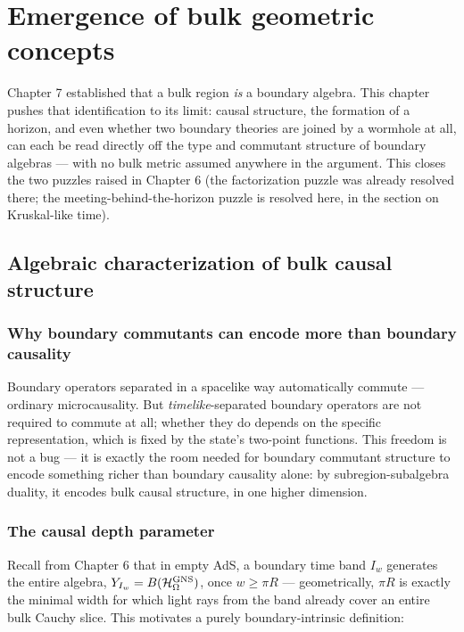 \chapter{Emergence of bulk geometric concepts}

Chapter 7 established that a bulk region \emph{is} a boundary algebra. This chapter pushes that identification
to its limit: causal structure, the formation of a horizon, and even whether two boundary theories are joined
by a wormhole at all, can each be read directly off the type and commutant structure of boundary algebras —
with no bulk metric assumed anywhere in the argument. This closes the two puzzles raised in Chapter 6
(the factorization puzzle was already resolved there; the meeting-behind-the-horizon puzzle is resolved here,
in the section on Kruskal-like time).

\section{Algebraic characterization of bulk causal structure}

\subsection*{Why boundary commutants can encode more than boundary causality}

Boundary operators separated in a spacelike way automatically commute — ordinary microcausality. But
\emph{timelike}-separated boundary operators are not required to commute at all; whether they do depends on
the specific representation, which is fixed by the state's two-point functions. This freedom is not a bug —
it is exactly the room needed for boundary commutant structure to encode something richer than boundary
causality alone: by subregion-subalgebra duality, it encodes bulk causal structure, in one higher dimension.

\subsection*{The causal depth parameter}

Recall from Chapter 6 that in empty AdS, a boundary time band $I_w$ generates the entire algebra,
$Y_{I_w}=B(\mathcal{H}_\Omega^{\text{GNS}})$, once $w\ge\pi R$ — geometrically, $\pi R$ is exactly the minimal width
for which light rays from the band already cover an entire bulk Cauchy slice. This motivates a purely
boundary-intrinsic definition:

